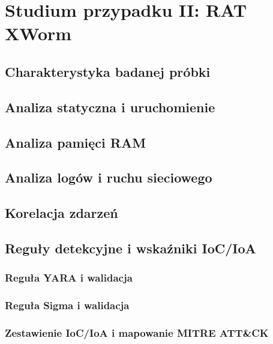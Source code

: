 \chapter{Studium przypadku II: RAT XWorm}\label{ch:studium_przypadku_2}

\section{Charakterystyka badanej próbki}\label{sec:cs2_charakterystyka}

\section{Analiza statyczna i uruchomienie}\label{sec:cs2_triage}

\section{Analiza pamięci RAM}\label{sec:cs2_analiza_ram}

\section{Analiza logów i ruchu sieciowego}\label{sec:cs2_analiza_logow}

\section{Korelacja zdarzeń}\label{sec:cs2_korelacja}

\section{Reguły detekcyjne i wskaźniki IoC/IoA}\label{sec:cs2_inzynieria_detekcji}

\subsection{Reguła YARA i walidacja}\label{subsec:cs2_yara}

\subsection{Reguła Sigma i walidacja}\label{subsec:cs2_sigma}

\subsection{Zestawienie IoC/IoA i mapowanie MITRE ATT\&CK}\label{subsec:cs2_ioc_mitre}
